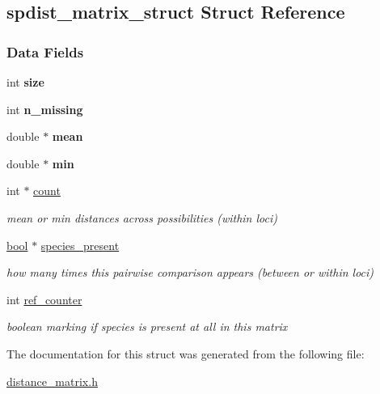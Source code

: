 \hypertarget{structspdist__matrix__struct}{}\subsection{spdist\+\_\+matrix\+\_\+struct Struct Reference}
\label{structspdist__matrix__struct}
\subsubsection*{Data Fields}
\begin{DoxyCompactItemize}
\item 
\mbox{\label{structspdist__matrix__struct_ab3f9eb0ceaa1fe6638d657b937fd1257}} 
int {\bfseries size}
\item 
\mbox{\label{structspdist__matrix__struct_a44ae2df725c4fdb1da276d513878c573}} 
int {\bfseries n\+\_\+missing}
\item 
\mbox{\label{structspdist__matrix__struct_a8841a7e54e32b1ef18e62ee60ffa60cb}} 
double $\ast$ {\bfseries mean}
\item 
\mbox{\label{structspdist__matrix__struct_a11ca683ad62f96fd4ec2ee10c875fc98}} 
double $\ast$ {\bfseries min}
\item 
\mbox{\label{structspdist__matrix__struct_a4a537b8180ec0b33d4e263e03bd5d579}} 
int $\ast$ \hyperlink{structspdist__matrix__struct_a4a537b8180ec0b33d4e263e03bd5d579}{count}
\begin{DoxyCompactList}\small\item\em mean or min distances across possibilities (within loci) \end{DoxyCompactList}\item 
\mbox{\label{structspdist__matrix__struct_adf10eb5aea5957e231a5032c1f1c412e}} 
\hyperlink{lowlevel_8h_a97a80ca1602ebf2303258971a2c938e2}{bool} $\ast$ \hyperlink{structspdist__matrix__struct_adf10eb5aea5957e231a5032c1f1c412e}{species\+\_\+present}
\begin{DoxyCompactList}\small\item\em how many times this pairwise comparison appears (between or within loci) \end{DoxyCompactList}\item 
\mbox{\label{structspdist__matrix__struct_a4c45767a5ee5888edfdb5ddb423fe5ca}} 
int \hyperlink{structspdist__matrix__struct_a4c45767a5ee5888edfdb5ddb423fe5ca}{ref\+\_\+counter}
\begin{DoxyCompactList}\small\item\em boolean marking if species is present at all in this matrix \end{DoxyCompactList}\end{DoxyCompactItemize}


The documentation for this struct was generated from the following file\+:\begin{DoxyCompactItemize}
\item 
\hyperlink{distance__matrix_8h}{distance\+\_\+matrix.\+h}\end{DoxyCompactItemize}
